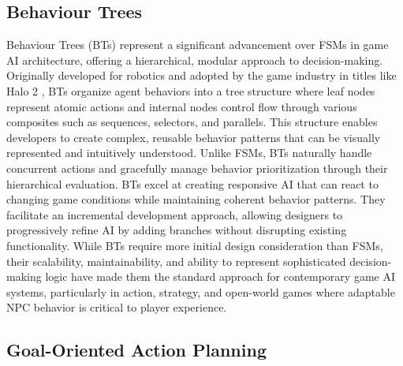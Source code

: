 \subsection{Behaviour Trees}

Behaviour Trees (BTs) represent a significant advancement over FSMs in game AI architecture, offering a hierarchical, modular approach to decision-making. 
Originally developed for robotics and adopted by the game industry in titles like Halo 2 \cite{simulacrum}, BTs organize agent behaviors into a tree structure where leaf nodes represent atomic actions and internal nodes control flow through various composites such as sequences, selectors, and parallels. 
This structure enables developers to create complex, reusable behavior patterns that can be visually represented and intuitively understood. 
Unlike FSMs, BTs naturally handle concurrent actions and gracefully manage behavior prioritization through their hierarchical evaluation.
BTs excel at creating responsive AI that can react to changing game conditions while maintaining coherent behavior patterns. 
They facilitate an incremental development approach, allowing designers to progressively refine AI by adding branches without disrupting existing functionality.
While BTs require more initial design consideration than FSMs, their scalability, maintainability, and ability to represent sophisticated decision-making logic have made them the standard approach for contemporary game AI systems, particularly in action, strategy, and open-world games where adaptable NPC behavior is critical to player experience.

\subsection{Goal-Oriented Action Planning}

